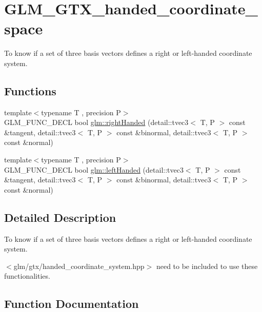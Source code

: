 \hypertarget{group__gtx__handed__coordinate__space}{}\section{G\+L\+M\+\_\+\+G\+T\+X\+\_\+handed\+\_\+coordinate\+\_\+space}
\label{group__gtx__handed__coordinate__space}


To know if a set of three basis vectors defines a right or left-\/handed coordinate system.  


\subsection*{Functions}
\begin{DoxyCompactItemize}
\item 
{\footnotesize template$<$typename T , precision P$>$ }\\G\+L\+M\+\_\+\+F\+U\+N\+C\+\_\+\+D\+E\+CL bool \hyperlink{group__gtx__handed__coordinate__space_ga16517e8a56cba5ba908e6eac6500ab94}{glm\+::right\+Handed} (detail\+::tvec3$<$ T, P $>$ const \&tangent, detail\+::tvec3$<$ T, P $>$ const \&binormal, detail\+::tvec3$<$ T, P $>$ const \&normal)
\item 
{\footnotesize template$<$typename T , precision P$>$ }\\G\+L\+M\+\_\+\+F\+U\+N\+C\+\_\+\+D\+E\+CL bool \hyperlink{group__gtx__handed__coordinate__space_ga2c0882af0eabd0e39da5680931f586ed}{glm\+::left\+Handed} (detail\+::tvec3$<$ T, P $>$ const \&tangent, detail\+::tvec3$<$ T, P $>$ const \&binormal, detail\+::tvec3$<$ T, P $>$ const \&normal)
\end{DoxyCompactItemize}


\subsection{Detailed Description}
To know if a set of three basis vectors defines a right or left-\/handed coordinate system. 

$<$glm/gtx/handed\+\_\+coordinate\+\_\+system.\+hpp$>$ need to be included to use these functionalities. 

\subsection{Function Documentation}
